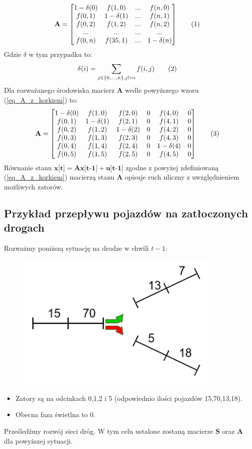 \documentclass[12pt]{book}
\theoremstyle{plain}
\newcommand\addtag{\refstepcounter{equation}
	\renewcommand{\labelenumii}{\theenumii}
	\renewcommand{\theenumii}{\theenumi.\arabic{enumii}.}
	\tag{\theequation}}
\let\oldref\ref
\renewcommand{\ref}[1]{(\oldref{#1})}
\begin{document}
\[\textbf{A}=\Af \addtag \label{eq_A_z_korkiem} \]
Gdzie $\delta$ w tym przypadku to:
\[\delta(i)=\sum_{j\in{\{0,...,n\}},j!=i} f(i,j) \addtag \]
Dla rozważanego środowiska macierz $ \textbf{A} $ wedle powyższego wzoru \ref{eq_A_z_korkiem} to:
\[\textbf{A}= \AenvXI \addtag \]
Równanie stanu $\textbf{x[t]}=\textbf{Ax[t-1]}+\textbf{u[t-1]}$ zgodne z powyżej zdefiniowaną \ref{eq_A_z_korkiem} macierzą stanu $\textbf{A}$ opisuje ruch uliczny z uwzględnieniem możliwych zatorów.
\subsection{Przykład przepływu pojazdów na zatłoczonych drogach}
Rozważmy poniższą sytuację na drodze w chwili $t-1$:
\begin{figure}[H]
	\centering
	\includegraphics[width=10cm]{images/env_11_case_0}
	\label{fig:env_11_case_0}
\end{figure}\noindent
\begin{itemize}
	\item Zatory są na odcinkach 0,1,2 i 5 (odpowiednio ilości pojazdów 15,70,13,18). 
	\item Obecna faza świetlna to 0.
\end{itemize}
Prześledźmy rozwój sieci dróg. W tym celu ustalone zostaną macierze $ \textbf{S} $ oraz $ \textbf{A} $ dla powyższej sytuacji.
\def \ScaseZero {\begin{bmatrix}
		1 & 0 & 0 & 0 & 0 & 0 \\
		1 & 1 & 0 & 0 & 0 & 0 \\
		0 & 1 & 1 & 0 & 0 & 0 \\
		0 & 0 & 1 & 1 & 0 & 0 \\
		0 & 0 & 0 & 0 & 1 & 0 \\
		0 & 0 & 0 & 0 & 1 & 1 
\end{bmatrix}}
\def \AcaseZero {\begin{bmatrix}
		\frac{5}{15}  & 0             & 0             & 0 & 0 & 0 \\
		\frac{10}{15} & \frac{60}{70} & 0             & 0 & 0 & 0 \\
		0          	  & \frac{10}{70} & \frac{3}{13}  & 0 & 0 & 0 \\
		0             & 0             & \frac{10}{13} & 0 & 0 & 0 \\
		0             & 0             & 0             & 0 & 0 & 0 \\
		0             & 0             & 0             & 0 & 1 & 0 
\end{bmatrix}}
\end{document}
